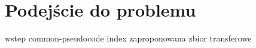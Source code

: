 \chapter{Podejście do problemu}
{wstep}
{common-pseudocode}
{index}
{zaproponowana}
\newpage
{zbior}
{transferowe}
